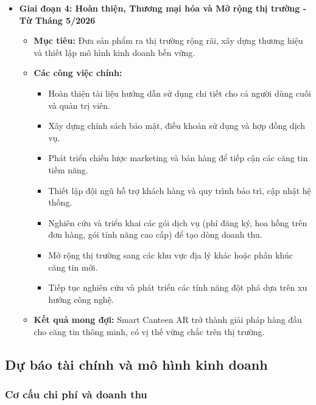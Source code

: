 \documentclass[12pt,a4paper]{article}
\begin{document}
\begin{itemize}[label=\textbullet]
    \item \textbf{Giai đoạn 4: Hoàn thiện, Thương mại hóa và Mở rộng thị trường - Từ Tháng 5/2026}
    \begin{itemize}[label=\textbullet]
        \item \textbf{Mục tiêu:} Đưa sản phẩm ra thị trường rộng rãi, xây dựng thương hiệu và thiết lập mô hình kinh doanh bền vững.
        \item \textbf{Các công việc chính:}
        \begin{itemize}[label=\textrightarrow]
            \item Hoàn thiện tài liệu hướng dẫn sử dụng chi tiết cho cả người dùng cuối và quản trị viên.
            \item Xây dựng chính sách bảo mật, điều khoản sử dụng và hợp đồng dịch vụ.
            \item Phát triển chiến lược marketing và bán hàng để tiếp cận các căng tin tiềm năng.
            \item Thiết lập đội ngũ hỗ trợ khách hàng và quy trình bảo trì, cập nhật hệ thống.
            \item Nghiên cứu và triển khai các gói dịch vụ (phí đăng ký, hoa hồng trên đơn hàng, gói tính năng cao cấp) để tạo dòng doanh thu.
            \item Mở rộng thị trường sang các khu vực địa lý khác hoặc phân khúc căng tin mới.
            \item Tiếp tục nghiên cứu và phát triển các tính năng đột phá dựa trên xu hướng công nghệ.
        \end{itemize}
        \item \textbf{Kết quả mong đợi:} Smart Canteen AR trở thành giải pháp hàng đầu cho căng tin thông minh, có vị thế vững chắc trên thị trường.
    \end{itemize}
\end{itemize}

\subsection{Dự báo tài chính và mô hình kinh doanh}

\subsubsection{Cơ cấu chi phí và doanh thu}
\end{document}
